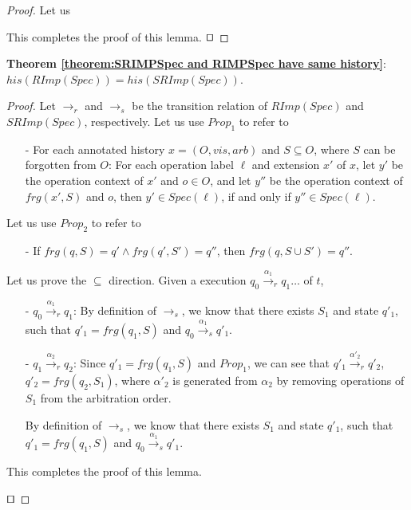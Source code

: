 \begin {proof} 

Let us 

This completes the proof of this lemma. $\qed$
\end {proof}






{\noindent \bf Theorem \ref{theorem:SRIMPSpec and RIMPSpec have same history}}: $\mathit{his}(\mathit{RImp}(\mathit{Spec})) = \mathit{his}(\mathit{SRImp}(\mathit{Spec}))$. 

\begin {proof} 

Let $\rightarrow_r$ and $\rightarrow_s$ be the transition relation of $\mathit{RImp}(\mathit{Spec})$ and $\mathit{SRImp}(\mathit{Spec})$, respectively. Let us use $\mathit{Prop}_1$ to refer to 

\begin{itemize}
\setlength{\itemsep}{0.5pt}
\item[-] For each annotated history $x = (O,\mathit{vis},\mathit{arb})$ and $S \subseteq O$, where $S$ can be forgotten from $O$: For each operation label $\ell$ and extension $x'$ of $x$, let $y'$ be the operation context of $x'$ and $o \in O$, and let $y''$ be the operation context of $frg(x',S)$ and $o$, then $y' \in Spec(\ell)$, if and only if $y'' \in Spec(\ell)$. 
\end{itemize}

Let us use $\mathit{Prop}_2$ to refer to 

\begin{itemize}
\setlength{\itemsep}{0.5pt} 
\item[-] If $\mathit{frg}(q,S) = q' \wedge \mathit{frg}(q',S') = q''$, then $\mathit{frg}(q,S \cup S') =q''$.
\end{itemize}




Let us prove the $\subseteq$ direction. Given a execution $q_0 {\xrightarrow{\alpha_1}}_r q_1 \ldots$ of $t$, 

\begin{itemize}
\setlength{\itemsep}{0.5pt}
\item[-] $q_0 {\xrightarrow{\alpha_1}}_r q_1$: By definition of $\rightarrow_s$, we know that there exists $S_1$ and state $q'_1$, such that $q'_1 = \mathit{frg}(q_1,S)$ and $q_0 {\xrightarrow{\alpha_1}}_s q'_1$. 

\item[-] $q_1 {\xrightarrow{\alpha_2}}_r q_2$: Since $q'_1 = \mathit{frg}(q_1,S)$ and $\mathit{Prop}_1$, we can see that $q'_1 {\xrightarrow{\alpha'_2}}_r q'_2$, $q'_2 = \mathit{frg}(q_2,S_1)$, where $\alpha'_2$ is generated from $\alpha_2$ by removing operations of $S_1$ from the arbitration order.

By definition of $\rightarrow_s$, we know that there exists $S_1$ and state $q'_1$, such that $q'_1 = \mathit{frg}(q_1,S)$ and $q_0 {\xrightarrow{\alpha_1}}_s q'_1$.
\end{itemize}

This completes the proof of this lemma. 

$\qed$
\end {proof}
